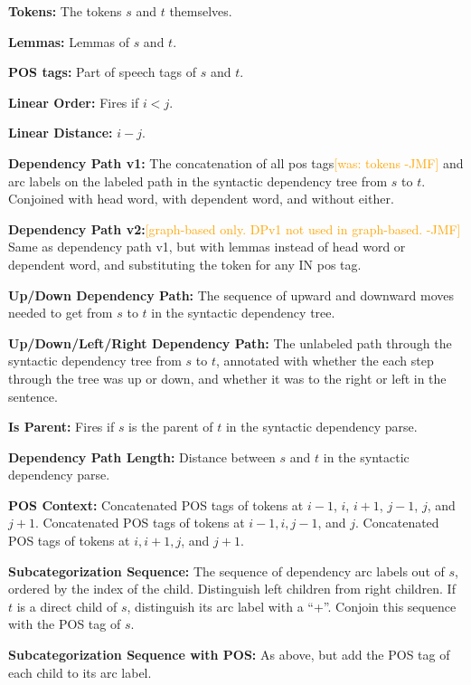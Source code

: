 \documentclass[11pt]{article}
\newcommand{\jmf}[1]{\textcolor{orange}{[#1 -JMF]}}
\begin{document}
\renewcommand{\floatpagefraction}{0.8}
\begin{table}
\begin{framed}
\begin{small}

\textbf{Tokens:} The tokens $s$ and $t$ themselves.

\textbf{Lemmas:} Lemmas of $s$ and $t$.

\textbf{POS tags:} Part of speech tags of $s$ and $t$.

\textbf{Linear Order:} Fires if $i < j$.

\textbf{Linear Distance:} $i - j$.

\textbf{Dependency Path v1:} The concatenation of all pos tags\jmf{was: tokens} and arc labels
	on the labeled path in the syntactic dependency tree from $s$ to $t$.  Conjoined with head word,
    with dependent word, and without either.

\textbf{Dependency Path v2:}\jmf{graph-based only. DPv1 not used in graph-based.} Same as dependency path v1, but with lemmas instead of head word
    or dependent word, and substituting the token for any IN pos tag.

\textbf{Up/Down Dependency Path:} The sequence of upward and
	downward moves needed to get from $s$ to $t$ in the syntactic dependency
	tree.

\textbf{Up/Down/Left/Right Dependency Path:} The unlabeled path through
	the syntactic dependency tree from $s$ to $t$, annotated with whether the each
	step through the tree was up or down, and whether it was to the right or left
	in the sentence.

\textbf{Is Parent:} Fires if  $s$ is the parent of $t$ in the syntactic
	dependency parse.

\textbf{Dependency Path Length:} Distance between $s$ and $t$ in the
	syntactic dependency parse.

\textbf{POS Context:} Concatenated POS tags of tokens at $i-1$, $i$,
	$i+1$, $j-1$, $j$, and $j+1$. Concatenated POS tags of tokens at $i-1, i, j-1$,
	and $j$. Concatenated POS tags of tokens at $i, i+1, j$, and $j+1$.

\textbf{Subcategorization Sequence:} 
	The sequence of dependency arc labels out of $s$, ordered by the index of the
	child.
	Distinguish left children from right children.
	If $t$ is a direct child of $s$, distinguish its arc label with a ``+''.
	Conjoin this sequence with the POS tag of $s$.

\textbf{Subcategorization Sequence with POS:} As above, but add the
	POS tag of each child to its arc label.


\end{small}
\end{framed}
\end{table}
\end{document}
